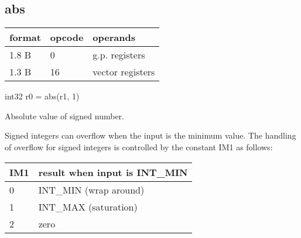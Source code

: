 \documentclass[forwardcom.tex]{subfiles}
\begin{document}
\subsection{abs}
\label{table:absInstruction}
\begin{tabular}{|p{12mm}|p{15mm}|p{100mm}|}
\hline
\bfseries format & \bfseries opcode & \bfseries operands \\ \hline
1.8 B &  0 & g.p. registers \\ \hline
1.3 B & 16 & vector registers \\ \hline
\end{tabular}
\vv

int32 r0 = abs(r1, 1)
\vv

Absolute value of signed number.
\vv

Signed integers can overflow when the input is the minimum value.
The handling of overflow for signed integers is controlled by the constant IM1 as follows:

\begin{longtable}{|p{12mm}|p{80mm}|}
\endfirsthead
\endhead
\hline
\bfseries IM1 & \bfseries result when input is INT\_MIN \\ \hline
0  & INT\_MIN (wrap around) \\ \hline
1  & INT\_MAX (saturation)  \\ \hline
2  & zero                   \\ \hline
\end{longtable}
\vv
\end{document}
